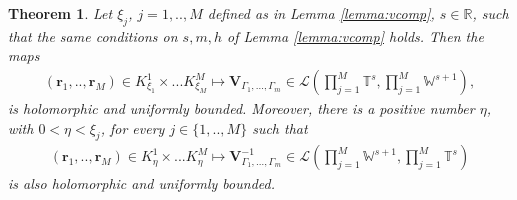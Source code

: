 \documentclass{article}
\newtheorem{theorem}{Theorem}[section]
\newcommand{\IR}{{\mathbb R}}
\newcommand{\IT}{{\mathbb T}}
\newcommand{\IW}{{\mathbb W}}
\newcommand{\br}{\bm{r}}
\begin{document}
\begin{theorem}
\label{thrm:Vop}
Let $\xi_j$, $j=1,..,M$ defined as in Lemma \ref{lemma:vcomp}, $s \in \IR$, such that the same conditions on $s,m,h$ of Lemma \ref{lemma:vcomp} holds. Then the maps 
\begin{align*}
(\br_1,..,\br_M) \in K^1_{\xi_1} \times ... K^M_{\xi_M} \mapsto 
\mathbf{V}_{\Gamma_1,\hdots,\Gamma_m} \in \mathcal{L}(\prod_{j=1}^M \IT^s, \prod_{j=1}^M \IW^{s+1}) ,
\end{align*}
is holomorphic and uniformly bounded. Moreover, there is a positive number $\eta$, with $0< \eta < \xi_j$, for every $j \in \{1,..,M\}$ such that 
\begin{align*}
(\br_1,..,\br_M) \in K^1_{\eta} \times ... K^M_{\eta} \mapsto 
\mathbf{V}_{\Gamma_1,\hdots,\Gamma_m}^{-1} \in \mathcal{L}(\prod_{j=1}^M \IW^{s+1}, \prod_{j=1}^M \IT^{s}) 
\end{align*}
is also holomorphic and uniformly bounded.
\end{theorem}
\end{document}
